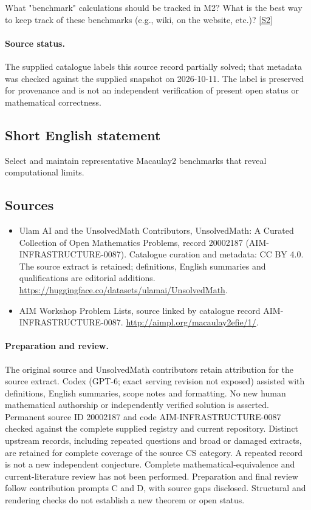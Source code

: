 \documentclass[11pt]{article}
\newcommand{\sref}[2]{\hyperlink{source:#1:#2}{[S#2]}}
\begin{document}
What "benchmark" calculations should be tracked in M2? What is the best way to keep track of these benchmarks (e.g., wiki, on the website, etc.)? \sref{20002187}{2}
\paragraph{Source status.}
The supplied catalogue labels this source record partially solved; that metadata was checked against the supplied snapshot on 2026-10-11. The label is preserved for provenance and is not an independent verification of present open status or mathematical correctness.
\subsection{Short English statement}
Select and maintain representative Macaulay2 benchmarks that reveal computational limits.
\subsection{Sources}
\begin{itemize}
\item[\hypertarget{source:20002187:1}{S1}] Ulam AI and the UnsolvedMath Contributors, UnsolvedMath: A Curated Collection of Open Mathematics Problems, record 20002187 (AIM-INFRASTRUCTURE-0087). Catalogue curation and metadata: CC BY 4.0. The source extract is retained; definitions, English summaries and qualifications are editorial additions.
\url{https://huggingface.co/datasets/ulamai/UnsolvedMath}.
\item[\hypertarget{source:20002187:2}{S2}] AIM Workshop Problem Lists, source linked by catalogue record AIM-INFRASTRUCTURE-0087.
\url{http://aimpl.org/macaulay2efie/1/}.
\end{itemize}
\paragraph{Preparation and review.}
The original source and UnsolvedMath contributors retain attribution for the source extract. Codex (GPT-6; exact serving revision not exposed) assisted with definitions, English summaries, scope notes and formatting. No new human mathematical authorship or independently verified solution is asserted. Permanent source ID 20002187 and code AIM-INFRASTRUCTURE-0087 checked against the complete supplied registry and current repository. Distinct upstream records, including repeated questions and broad or damaged extracts, are retained for complete coverage of the source CS category. A repeated record is not a new independent conjecture. Complete mathematical-equivalence and current-literature review has not been performed. Preparation and final review follow contribution prompts C and D, with source gaps disclosed. Structural and rendering checks do not establish a new theorem or open status.
\label{end:20002187}
\end{document}
